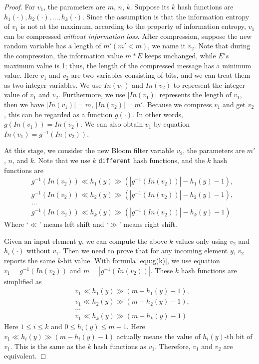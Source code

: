 \begin{proof}
For $v_1$, the parameters are $m$, $n$, $k$. 
%
Suppose its $k$ hash functions are $h_1(\cdot), h_2(\cdot), \ldots, h_k(\cdot)$.
%
Since the assumption is that the information entropy of $v_1$ is not at the maximum, according to the property of information entropy, $v_1$ can be compressed \textit{without information loss}. 
%
After compression, suppose the new random variable has a length of $m' (m' < m)$, we name it $v_2$.
%
Note that during the compression, the information value $m*E$ keeps unchanged, while $E's$ maximum value is 1; thus, the length of the compressed message has a minimum value.
%
Here $v_1$ and $v_2$ are two variables consisting of bits, and we can treat them as two integer variables. 
%
We use $In(v_1)$ and  $In(v_2)$ to represent the integer value of $v_1$ and $v_2$.
%
Furthermore, we use $|In(v_1)|$ represents the length of $v_1$, then we have  $|In(v_1)|=m$, $|In(v_2)|=m'$.
%
Because we compress $v_1$ and get $v_2$, this can be regarded as a function $g(\cdot)$. 
%
In other words, $g(In(v_1))=In(v_2)$. 
%
We can also obtain $v_1$ by equation $In(v_1)=g^{-1}(In(v_2))$.

At this stage, we consider the new Bloom filter variable $v_2$, the parameters are $m'$, $n$, and $k$.
%
Note that we use $k$ \texttt{different} hash functions, and the $k$ hash functions are
%
\begin{equation}
\begin{aligned}
&g^{-1}(In(v_2))\ll h_1(y) \gg (|g^{-1}(In(v_2))|-h_1(y)-1), \\
&g^{-1}(In(v_2))\ll h_2(y) \gg (|g^{-1}(In(v_2))|-h_2(y)-1), \\
& \ldots \\
&g^{-1}(In(v_2))\ll h_k(y) \gg (|g^{-1}(In(v_2))|-h_k(y)-1)
\end{aligned}
\label{equ:g(k)}
\end{equation}
%
Where `$\ll$' means left shift and `$\gg$' means right shift.

Given an input element $y$, we can compute the above $k$ values only using $v_2$ and $h_i(\cdot)$ without $v_1$.
%
Then we need to prove that for any incoming element $y$, $v_2$ reports the same $k$-bit value.
%
With formula \ref{equ:g(k)}, we use equation $v_1=g^{-1}(In(v_2))$ and $m=|g^{-1}(In(v_2))|$.
%
These $k$ hash functions are simplified as
%
\begin{equation}
\begin{aligned}
&v_1\ll h_1(y) \gg (m-h_1(y)-1), \\
&v_1\ll h_2(y) \gg (m-h_2(y)-1), \\
& \ldots \\
&v_1\ll h_k(y) \gg (m-h_k(y)-1)
\end{aligned}
\label{equ:g(k):simple}
\end{equation}
%
Here $1\leqslant i\leqslant k$ and $0\leqslant h_i(y)\leqslant m-1$.
%
Here $v_1\ll h_i(y) \gg (m-h_i(y)-1)$ actually means the value of $h_i(y)$-th bit of $v_1$.
%
This is the same as the $k$ hash functions as $v_1$. 
%
Therefore, $v_1$ and $v_2$ are equivalent.
\end{proof}

